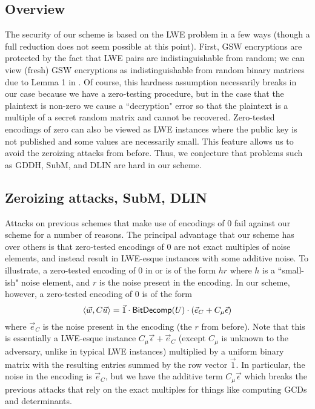 \subsection{Overview}

The security of our scheme is based on the LWE problem in a few ways (though a full reduction does not seem possible at this point).  First, GSW encryptions are protected by the fact that LWE pairs are indistinguishable from random; we can view (fresh) GSW encryptions as indistinguishable from random binary matrices due to Lemma 1 in \cite{gsw}.  Of course, this hardness assumption necessarily breaks in our case because we have a zero-testing procedure, but in the case that the plaintext is non-zero we cause a ``decryption" error so that the plaintext is a multiple of a secret random matrix and cannot be recovered.  Zero-tested encodings of zero can also be viewed as LWE instances where the public key is not published and some values are necessarily small.  This feature allows us to avoid the zeroizing attacks from before.  Thus, we conjecture that problems such as GDDH, SubM, and DLIN are hard in our scheme.

\subsection{Zeroizing attacks, SubM, DLIN}
Attacks on previous schemes \cite{chl,cgh,hj} that make use of encodings of 0 fail against our scheme for a number of reasons. The principal advantage that our scheme has over others is that zero-tested encodings of $0$ are not exact multiples of noise elements, and instead result in LWE-esque instances with some additive noise.  To illustrate, a zero-tested encoding of $0$ in \cite{clt} or \cite{ggh13a} is of the form $hr$ where $h$ is a ``small-ish" noise element, and $r$ is the noise present in the encoding.  In our scheme, however, a zero-tested encoding of $0$ is of the form
$$\left<\vec{w}, C \vec{u}\right> = \vec{1}\cdot \mathsf{BitDecomp}(U)\cdot (\vec{e}_C + C_\mu\vec{\epsilon})$$
where $\vec{e}_C$ is the noise present in the encoding (the $r$ from before).  Note that this is essentially a LWE-esque instance $C_\mu\vec{\epsilon} + \vec{e}_C$ (except $C_\mu$ is unknown to the adversary, unlike in typical LWE instances) multiplied by a uniform binary matrix with the resulting entries summed by the row vector $\vec{1}$.  In particular, the noise in the encoding is $\vec{e}_C$, but we have the additive term $C_\mu\vec{\epsilon}$ which breaks the previous attacks that rely on the exact multiples for things like computing GCDs and determinants. 

